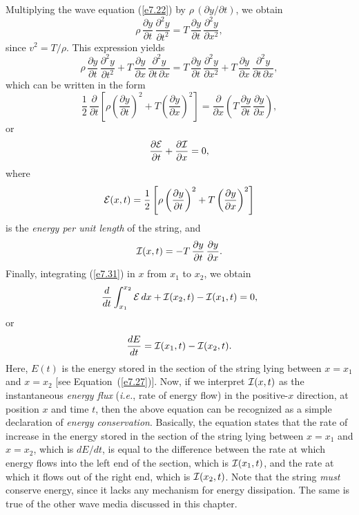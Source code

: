 Multiplying the wave equation  (\ref{e7.22}) by $\rho\,(\partial y/\partial t)$, 
we obtain
\begin{equation}
\rho\,\frac{\partial y}{\partial t} \,\frac{\partial^2 y}{\partial t^2}= T \,\frac{\partial y}{\partial t}\,\frac{\partial^2 y}{\partial x^2},
\end{equation}
since $v^2=T/\rho$. 
This expression yields
\begin{equation}
\rho\,\frac{\partial y}{\partial t} \,\frac{\partial^2 y}{\partial t^2} + T\,\frac{\partial y}{\partial x}\,\frac{\partial^2 y}{\partial t\,\partial x}= T \,\frac{\partial y}{\partial t}\,\frac{\partial^2 y}{\partial x^2}  + T\,\frac{\partial y}{\partial x}\,\frac{\partial^2 y}{\partial t\,\partial x},
\end{equation}
which can be written in the form
\begin{equation}
\frac{1}{2}\,\frac{\partial}{\partial t}\!\left[\rho\left(\frac{\partial y}{\partial t}\right)^2
+ T\left(\frac{\partial y}{\partial x}\right)^2\right] = \frac{\partial }{\partial x}\!\left(T\,\frac{\partial y}{\partial t}\,\frac{\partial y}{\partial x}\right),
\end{equation}
or
\begin{equation}\label{e7.31}
\frac{\partial {\cal E}}{\partial  t} + \frac{\partial {\cal I}}{\partial x} = 0,
\end{equation}
where
\begin{equation}
{\cal E}(x,t) = \frac{1}{2}\left[\rho \left(\frac{\partial y}{\partial t}\right)^2
+ T\left(\frac{\partial y}{\partial x}\right)^2\right] 
\end{equation}
is the {\em energy per unit length}\/ of the string, and
\begin{equation}\label{e7.33}
{\cal I}(x,t) = - T\,\frac{\partial y}{\partial t}\,\frac{\partial y}{\partial x}.
\end{equation}
Finally, integrating (\ref{e7.31}) in $x$ from $x_1$ to $x_2$, we obtain
\begin{equation}
\frac{d}{dt} \int_{x_1}^{x_2} {\cal E}\,dx + {\cal I}(x_2,t)-{\cal I}(x_1,t) = 0,
\end{equation}
or
\begin{equation}
\frac{d E}{dt} = {\cal I}(x_1,t)-{\cal I}(x_2,t).
\end{equation}
Here, $E(t)$ is the energy stored in the section of the string lying between $x=x_1$ and
$x=x_2$ [see Equation~(\ref{e7.27})]. Now, if we interpret ${\cal I}(x,t)$ as the instantaneous {\em energy flux}\/ ({\em i.e.}, rate of energy flow)
in the positive-$x$ direction, at position $x$ and time $t$, then the above equation
can be recognized as a simple declaration of {\em energy conservation}. Basically, 
the equation states that the
rate of increase in the energy stored in the section of the string lying between $x=x_1$ and $x=x_2$, which is $dE/dt$,  is equal to the difference between the rate at which energy flows into
the left end of the section, which is ${\cal I}(x_1,t)$,  and the rate at which it flows out of the right end, which is ${\cal I}(x_2,t)$. Note that the string {\em must}\/ conserve energy,
since it lacks any mechanism for energy dissipation. The same is true of the
other wave media discussed in this chapter. 

